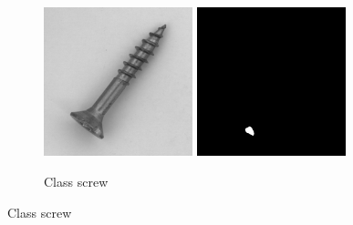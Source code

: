 \begin{figure}[ht]
\begin{subfigure}[b]{0.3\textwidth}
    \end{subfigure}
    \hfill
    \begin{subfigure}[b]{0.3\textwidth}
        \centering
        \includegraphics[width=0.475\textwidth]{figures/mvtecadexampleimages/screw023.png}
        \includegraphics[width=0.475\textwidth]{figures/mvtecadexampleimages/screw023_mask.png}
        \caption*{Class screw}


\end{subfigure}
\end{figure}
